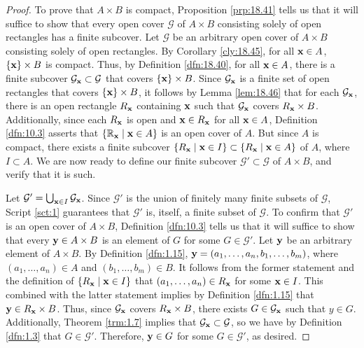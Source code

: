 \documentclass[../main.tex]{subfiles}
\begin{document}
\begin{theorem}
\begin{proof}

        To prove that $A\times B$ is compact, Proposition \ref{prp:18.41} tells us that it will suffice to show that every open cover $\mathcal{G}$ of $A\times B$ consisting solely of open rectangles has a finite subcover. Let $\mathcal{G}$ be an arbitrary open cover of $A\times B$ consisting solely of open rectangles. By Corollary \ref{cly:18.45}, for all $\mathbf{x}\in A$, $\{\mathbf{x}\}\times B$ is compact. Thus, by Definition \ref{dfn:18.40}, for all $\mathbf{x}\in A$, there is a finite subcover $\mathcal{G}_{\mathbf{x}}\subset\mathcal{G}$ that covers $\{\mathbf{x}\}\times B$. Since $\mathcal{G}_{\mathbf{x}}$ is a finite set of open rectangles that covers $\{\mathbf{x}\}\times B$, it follows by Lemma \ref{lem:18.46} that for each $\mathcal{G}_{\mathbf{x}}$, there is an open rectangle $R_{\mathbf{x}}$ containing $\mathbf{x}$ such that $\mathcal{G}_{\mathbf{x}}$ covers $R_{\mathbf{x}}\times B$. Additionally, since each $R_{\mathbf{x}}$ is open and $\mathbf{x}\in R_{\mathbf{x}}$ for all $\mathbf{x}\in A$, Definition \ref{dfn:10.3} asserts that $\{\mathbb{R}_{\mathbf{x}}\mid\mathbf{x}\in A\}$ is an open cover of $A$. But since $A$ is compact, there exists a finite subcover $\{R_{\mathbf{x}}\mid\mathbf{x}\in I\}\subset\{R_{\mathbf{x}}\mid\mathbf{x}\in A\}$ of $A$, where $I\subset A$. We are now ready to define our finite subcover $\mathcal{G}'\subset\mathcal{G}$ of $A\times B$, and verify that it is such.\par
        Let $\mathcal{G}'=\bigcup_{\mathbf{x}\in I}\mathcal{G}_{\mathbf{x}}$. Since $\mathcal{G}'$ is the union of finitely many finite subsets of $\mathcal{G}$, Script \ref{sct:1} guarantees that $\mathcal{G}'$ is, itself, a finite subset of $\mathcal{G}$. To confirm that $\mathcal{G}'$ is an open cover of $A\times B$, Definition \ref{dfn:10.3} tells us that it will suffice to show that every $\mathbf{y}\in A\times B$ is an element of $G$ for some $G\in\mathcal{G}'$. Let $\mathbf{y}$ be an arbitrary element of $A\times B$. By Definition \ref{dfn:1.15}, $\mathbf{y}=(a_1,\dots,a_n,b_1,\dots,b_m)$, where $(a_1,\dots,a_n)\in A$ and $(b_1,\dots,b_m)\in B$. It follows from the former statement and the definition of $\{R_{\mathbf{x}}\mid\mathbf{x}\in I\}$ that $(a_1,\dots,a_n)\in R_{\mathbf{x}}$ for some $\mathbf{x}\in I$. This combined with the latter statement implies by Definition \ref{dfn:1.15} that $\mathbf{y}\in R_{\mathbf{x}}\times B$. Thus, since $\mathcal{G}_{\mathbf{x}}$ covers $R_{\mathbf{x}}\times B$, there exists $G\in\mathcal{G}_{\mathbf{x}}$ such that $y\in G$. Additionally, Theorem \ref{trm:1.7} implies that $\mathcal{G}_{\mathbf{x}}\subset\mathcal{G}$, so we have by Definition \ref{dfn:1.3} that $G\in\mathcal{G}'$. Therefore, $\mathbf{y}\in G$ for some $G\in\mathcal{G}'$, as desired.
    \end{proof}
\end{theorem}
\end{document}
